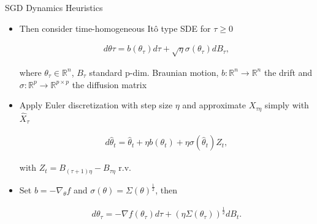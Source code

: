 \documentclass[fleqn]{beamer}
\begin{document}
    \begin{frame}{SGD Dynamics Heuristics}
        \begin{itemize}
            \item Then consider  time-homogeneous It\^o type SDE for $\tau\ge 0$
            \begin{center}
            \begin{minipage}{0.5\textwidth}
                \begin{align*}
                    d\theta\tau = b(\theta_\tau)d\tau
                    +\sqrt{\eta}\sigma(\theta_\tau)dB_\tau,
                \end{align*}
            \end{minipage}
            \end{center}
            where $\theta_\tau \in \mathbb{R}^{n}$, $B_\tau$ standard p-dim. Braunian
            motion, $b:\mathbb{R}^{n} \to \mathbb{R}^{n}$ the drift and
            $\sigma: \mathbb{R}^{p}\to \mathbb{R}^{p\times p}$ the diffusion
            matrix

        \item Apply Euler discretization with step size $\eta$ and
            approximate $X_{\tau \eta}$ simply with $\hat{X}_{\tau}$
            \begin{center}
            \begin{minipage}{0.5\textwidth}
                \begin{align*}
                    d\hat{\theta}_t= \hat{\theta}_t + \eta b(\theta_t)
                    +\eta \sigma(\hat{\theta}_t)Z_t,
                \end{align*}
            \end{minipage}
            \end{center}
            with $Z_t = B_{(\tau+1)\eta} - B_{\tau\eta}$ r.v.

        \item Set $b = -\nabla_\theta f$ and $\sigma(\theta) =
            \Sigma(\theta)^{\frac{1}{2}}$, then
            \begin{center}
            \begin{minipage}{0.5\textwidth}
                \begin{align*}
                    d\theta_\tau = -\nabla f(\theta_\tau)d\tau
                    + (\eta\Sigma(\theta_\tau))^{\frac{1}{2}} dB_t.
                \end{align*}
            \end{minipage}
            \end{center}
        \end{itemize}
    \end{frame}
\end{document}
